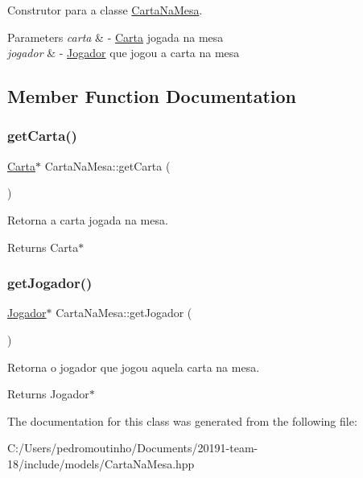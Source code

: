 Construtor para a classe \mbox{\hyperlink{class_carta_na_mesa}{Carta\+Na\+Mesa}}. 


\begin{DoxyParams}{Parameters}
{\em carta} & -\/ \mbox{\hyperlink{class_carta}{Carta}} jogada na mesa \\
\hline
{\em jogador} & -\/ \mbox{\hyperlink{class_jogador}{Jogador}} que jogou a carta na mesa \\
\hline
\end{DoxyParams}


\subsection{Member Function Documentation}
\mbox{\label{class_carta_na_mesa_a2019e0269144f552f218ae795b7ab599}} 
\subsubsection{\texorpdfstring{getCarta()}{getCarta()}}
{\footnotesize\ttfamily \mbox{\hyperlink{class_carta}{Carta}}$\ast$ Carta\+Na\+Mesa\+::get\+Carta (\begin{DoxyParamCaption}{ }\end{DoxyParamCaption})}



Retorna a carta jogada na mesa. 

\begin{DoxyReturn}{Returns}
Carta$\ast$ 
\end{DoxyReturn}
\mbox{\label{class_carta_na_mesa_a2dd1806034ff0ca5cb9c02a28bee709f}} 
\subsubsection{\texorpdfstring{getJogador()}{getJogador()}}
{\footnotesize\ttfamily \mbox{\hyperlink{class_jogador}{Jogador}}$\ast$ Carta\+Na\+Mesa\+::get\+Jogador (\begin{DoxyParamCaption}{ }\end{DoxyParamCaption})}



Retorna o jogador que jogou aquela carta na mesa. 

\begin{DoxyReturn}{Returns}
Jogador$\ast$ 
\end{DoxyReturn}


The documentation for this class was generated from the following file\+:\begin{DoxyCompactItemize}
\item 
C\+:/\+Users/pedromoutinho/\+Documents/20191-\/team-\/18/include/models/Carta\+Na\+Mesa.\+hpp\end{DoxyCompactItemize}
